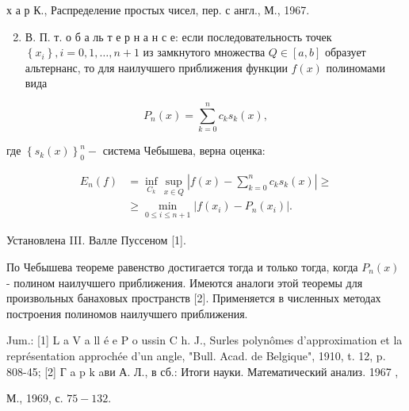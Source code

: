 \documentclass[10pt]{article}
\begin{document}
х а р К., Распределение простых чисел, пер. с англ., М., 1967.



\begin{enumerate}

  \setcounter{enumi}{1}

  \item В. П. т. о б а ль т е р н а н с е: если последовательность точек $\left\{x_{i}\right\}, i=0,1, \ldots, n+1$ из замкнутого множества $Q \in[a, b]$ образует альтернанс, то для наилучшего приближения функции $f(x)$ полиномами вида

\end{enumerate}



\[

P_{n}(x)=\sum_{k=0}^{n} c_{k} s_{k}(x),

\]



где $\left\{s_{k}(x)\right\}_{0}^{n}-$ система Чебышева, верна оценка:



\[

\begin{aligned}

E_{n}(f) & =\inf _{C_{k}} \sup _{x \in Q}\left|f(x)-\sum_{k=0}^{n} c_{k} s_{k}(x)\right| \geqslant \\

& \geqslant \min _{0 \leqslant i \leqslant n+1}\left|f\left(x_{i}\right)-P_{n}\left(x_{i}\right)\right| .

\end{aligned}

\]



Установлена III. Валле Пуссеном [1].



По Чебышева теореме равенство достигается тогда и только тогда, когда $P_{n}(x)$ - полином наилучшего приближения. Имеются аналоги этой теоремы для произвольных банаховых пространств [2]. Применяется в численных методах построения полиномов наилучшего приближения.



Jum.: [1] L a V a ll é e P o ussin C h. J., Surles polynômes d'approximation et la représentation approchée d'un angle, "Bull. Acad. de Belgique", 1910, t. 12, p. 808-45; [2] Г a p $\mathrm{k}$ aви А. Л., в сб.: Итоги науки. Математический анализ. 1967 ,

М., 1969, с. $75-132$.
\end{document}
